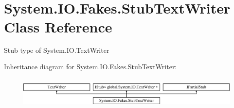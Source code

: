\hypertarget{class_system_1_1_i_o_1_1_fakes_1_1_stub_text_writer}{\section{System.\-I\-O.\-Fakes.\-Stub\-Text\-Writer Class Reference}
\label{class_system_1_1_i_o_1_1_fakes_1_1_stub_text_writer}
}


Stub type of System.\-I\-O.\-Text\-Writer 


Inheritance diagram for System.\-I\-O.\-Fakes.\-Stub\-Text\-Writer\-:\begin{figure}[H]
\begin{center}
\leavevmode
\includegraphics[height=1.637427cm]{class_system_1_1_i_o_1_1_fakes_1_1_stub_text_writer}
\end{center}
\end{figure}
